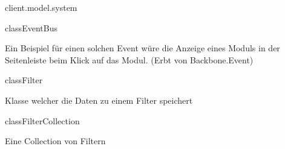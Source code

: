 \begin{texdocpackage}{client.model.system}
\begin{texdocclass}{class}{EventBus}
\begin{texdocclassintro}
 Ein Beispiel für einen solchen Event würe die Anzeige eines Moduls in der
 Seitenleiste beim Klick auf das Modul. (Erbt von Backbone.Event)\end{texdocclassintro}
\begin{texdocclassconstructors}
\end{texdocclassconstructors}
\begin{texdocclassmethods}
\end{texdocclassmethods}
\end{texdocclass}


\begin{texdocclass}{class}{Filter}
\label{texdoclet:edu.kit.informatik.studyplan.client.model.system.Filter}
\begin{texdocclassintro}
Klasse welcher die Daten zu einem Filter speichert\end{texdocclassintro}
\begin{texdocclassconstructors}
\end{texdocclassconstructors}
\begin{texdocclassmethods}
\end{texdocclassmethods}
\end{texdocclass}


\begin{texdocclass}{class}{FilterCollection}
\label{texdoclet:edu.kit.informatik.studyplan.client.model.system.FilterCollection}
\begin{texdocclassintro}
Eine Collection von Filtern\end{texdocclassintro}
\begin{texdocclassconstructors}
\end{texdocclassconstructors}
\end{texdocclass}



\end{texdocpackage}
